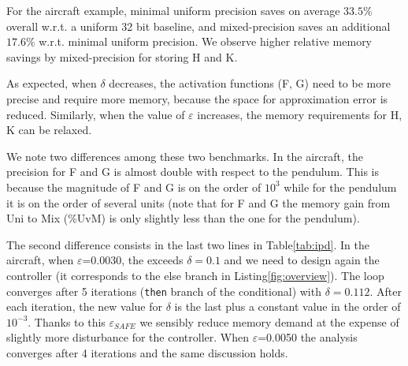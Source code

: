 For the aircraft example, minimal uniform precision saves on average $33.5\%$
overall w.r.t. a uniform 32 bit baseline, and mixed-precision saves an
additional $17.6\%$ w.r.t. minimal uniform precision. We observe higher relative
memory savings by mixed-precision for storing H and K.


As expected, when $\delta$ decreases, the activation functions (F, G) need to be
more precise and require more memory, because the space for approximation error
is reduced. Similarly, when the value of $\varepsilon$ increases, the memory
requirements for H, K can be relaxed.

We note two differences among these two benchmarks.
In the aircraft,
the precision for F and G is almost double with respect to the pendulum. This is
because the magnitude of F and G is on the order of $10^{3}$ while for the
pendulum it is on the order of several units (note that for F and G the memory gain
from Uni to Mix (\%UvM) is only slightly less than the one for the pendulum).

The second difference consists in the last two lines in Table\ref{tab:ipd}.
In the aircraft, when $\varepsilon$=0.0030, the \maxUij exceeds $\delta=0.1$ and we
need to design again the controller (it corresponds to the else branch in
Listing\ref{fig:overview}). The loop converges after 5 iterations (\texttt{then}
branch of the conditional) with $\delta=0.112$. After each iteration, the new value
for $\delta$ is the last \maxUij\space plus a constant value in the order of
$10^{-3}$. Thanks to this $\varepsilon_{SAFE}$ we sensibly reduce memory demand
at the expense of slightly more disturbance for the controller. When
$\varepsilon$=0.0050 the analysis converges after 4 iterations and the same
discussion holds.


